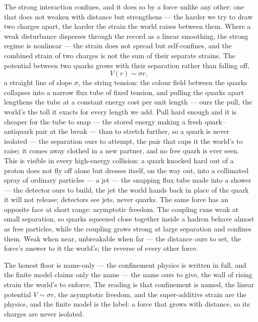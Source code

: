 The strong interaction confines, and it does so by a force unlike any other: one that does not weaken with
distance but strengthens --- the harder we try to draw two charges apart, the harder the strain the world
raises between them. Where a weak disturbance disperses through the record as a linear smoothing, the
strong regime is nonlinear --- the strain does not spread but self-confines, and the combined strain of two
charges is not the sum of their separate strains. The potential between two quarks grows with their separation
rather than falling off,
\begin{equation}
  V(r) \sim \sigma r,
\end{equation}
a straight line of slope $\sigma$, the string tension: the colour field between the quarks collapses into a
narrow flux tube of fixed tension, and pulling the quarks apart lengthens the tube at a constant energy cost
per unit length --- ours the pull, the world's the toll it exacts for every length we add. Pull hard enough and
it is cheaper for the tube to snap --- the stored energy making a fresh quark--antiquark pair at the break ---
than to stretch further, so a quark is never isolated --- the separation ours to attempt, the pair that caps it
the world's to raise; it comes away clothed in a new partner, and no free quark is ever seen. This is visible in every high-energy collision: a
quark knocked hard out of a proton does not fly off alone but dresses itself, on the way out, into a
collimated spray of ordinary particles --- a jet --- the snapping flux tube made into a shower --- the detector
ours to build, the jet the world hands back in place of the quark it will not release; detectors see
jets, never quarks. The same force has an opposite face at short range:
asymptotic freedom. The coupling runs weak at small separation, so quarks squeezed close together inside a
hadron behave almost as free particles, while the coupling grows strong at large separation and confines them.
Weak when near, unbreakable when far --- the distance ours to set, the force's answer to it the world's; the
reverse of every other force.

The honest floor is name-only --- the confinement physics is written in full, and the finite model claims only
the name --- the name ours to give, the wall of rising strain the world's to enforce. The reading is that
confinement is named, the linear potential $V \sim \sigma r$, the asymptotic
freedom, and the super-additive strain are the physics, and the finite model is the label: a force that grows
with distance, so its charges are never isolated.

